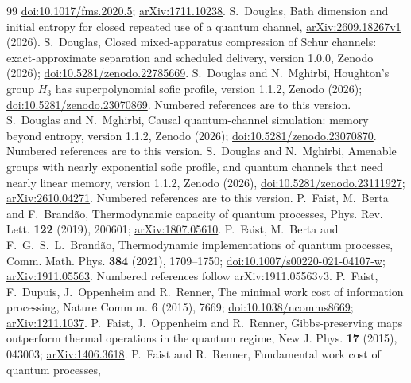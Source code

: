 \begin{thebibliography}{99}
\href{https://doi.org/10.1017/fms.2020.5}{doi:10.1017/fms.2020.5};
\href{https://arxiv.org/abs/1711.10238}{arXiv:1711.10238}.
 S.~Douglas, Bath dimension and initial entropy for closed repeated use of a quantum channel,
\href{https://arxiv.org/abs/2609.18267v1}{arXiv:2609.18267v1} (2026).
 S.~Douglas, Closed mixed-apparatus compression of Schur channels:
exact-approximate separation and scheduled delivery, version 1.0.0, Zenodo (2026);
\href{https://doi.org/10.5281/zenodo.22785669}{doi:10.5281/zenodo.22785669}.
 S.~Douglas and N.~Mghirbi, Houghton's group $H_3$ has superpolynomial sofic profile, version 1.1.2, Zenodo (2026);
\href{https://doi.org/10.5281/zenodo.23070869}{doi:10.5281/zenodo.23070869}. Numbered references are to this version.
 S.~Douglas and N.~Mghirbi, Causal quantum-channel simulation: memory beyond entropy, version 1.1.2, Zenodo (2026);
\href{https://doi.org/10.5281/zenodo.23070870}{doi:10.5281/zenodo.23070870}. Numbered references are to this version.
 S.~Douglas and N.~Mghirbi, Amenable groups with nearly exponential sofic profile, and quantum channels that need nearly linear memory,
version 1.1.2, Zenodo (2026), \href{https://doi.org/10.5281/zenodo.23111927}{doi:10.5281/zenodo.23111927};
\href{https://arxiv.org/abs/2610.04271}{arXiv:2610.04271}. Numbered references are to this version.
 P.~Faist, M.~Berta and F.~Brand\~ao,
Thermodynamic capacity of quantum processes, Phys. Rev. Lett. \textbf{122} (2019), 200601;
\href{https://arxiv.org/abs/1807.05610}{arXiv:1807.05610}.
 P.~Faist, M.~Berta and F.~G.~S.~L.~Brand\~ao,
Thermodynamic implementations of quantum processes, Comm. Math. Phys. \textbf{384} (2021), 1709--1750;
\href{https://doi.org/10.1007/s00220-021-04107-w}{doi:10.1007/s00220-021-04107-w}; \href{https://arxiv.org/abs/1911.05563}{arXiv:1911.05563}.
Numbered references follow arXiv:1911.05563v3.
 P.~Faist, F.~Dupuis, J.~Oppenheim and R.~Renner,
The minimal work cost of information processing, Nature Commun. \textbf{6} (2015), 7669;
\href{https://doi.org/10.1038/ncomms8669}{doi:10.1038/ncomms8669};
\href{https://arxiv.org/abs/1211.1037}{arXiv:1211.1037}.
 P.~Faist, J.~Oppenheim and R.~Renner, Gibbs-preserving maps outperform thermal operations
in the quantum regime, New J. Phys. \textbf{17} (2015), 043003; \href{https://arxiv.org/abs/1406.3618}{arXiv:1406.3618}.
 P.~Faist and R.~Renner, Fundamental work cost of quantum processes,

\end{thebibliography}
